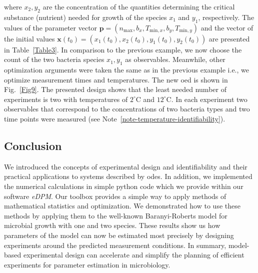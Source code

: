 \documentclass[graybox]{svmult}
\newcommand{\mbx}{\mathbf{x}}
\newcommand{\mbp}{\mathbf{p}}
\begin{document}
where $x_2, y_2$ are the concentration of the quantities determining the critical substance (nutrient) needed for growth of the species $x_1$ and $y_1$, respectively.
The values of the parameter vector $\mbp = (n_\text{max}, b_x, T_{\text{min}, x}, b_y, T_{\text{min}, y})$ and the vector of the initial values $\mbx(t_0)=(x_1(t_0), x_2(t_0), y_1(t_0), y_2(t_0))$ are presented in Table~\ref{Table3}.
%
In comparison to the previous example, we now choose the count of the two bacteria species $x_1,y_1$ as observables.
Meanwhile, other optimization arguments were taken the same as in the previous example i.e., we optimize measurement times and temperatures.
The new \ac{oed} is shown in Fig.~\ref{Fig9}.
%
%
The presented design shows that the least needed number of experiments is two with temperatures of $2^\circ$C and $12^\circ$C.
In each experiment two observables that correspond to the concentrations of two bacteria types and two time points were measured (see Note~\ref{note-temperature-identifiability}).
%
%
%
\subsection{Conclusion}
We introduced the concepts of experimental design and identifiability and their practical applications to systems described by \acp{ode}.
In addition, we implemented the numerical calculations in simple python code which we provide within our software {\it eDPM}.
Our toolbox provides a simple way to apply methods of mathematical statistics and optimization.
We demonstrated how to use these methods by applying them to the well-known Baranyi-Roberts model for microbial growth with one and two species.
These results show us how parameters of the model can now be estimated most precisely by designing experiments around the predicted measurement conditions.
In summary, model-based experimental design can accelerate and simplify the planning of efficient experiments for parameter estimation in microbiology.
\end{document}
